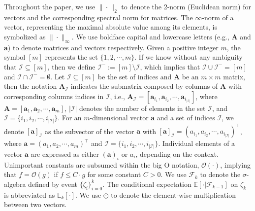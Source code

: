 \documentclass[aos]{imsart}
\numberwithin{equation}{section}
\theoremstyle{plain}
\begin{document}
Throughout the paper, we use $\|\cdot\|_2$ to denote the 2-norm (Euclidean norm) for vectors and the corresponding spectral norm for matrices. The $\infty$-norm of a vector, representing the maximal absolute value among its elements, is symbolized as $\|\cdot\|_{\infty}$. We use boldface capital and lowercase letters (e.g., $\bm{A}$ and $\bm{a}$) to denote matrices and vectors respectively. Given a positive integer $m$, the symbol $[m]$ represents the set $\{1, 2, \cdots, m\}$. If we know without any ambiguity that $\mathcal{I} \subseteq [m]$, then we define $\mathcal{I}^{-} := [m] \setminus \mathcal{I}$, which implies that $\mathcal{I} \cup \mathcal{I}^{-} = [m]$ and $\mathcal{I} \cap \mathcal{I}^{-} = \emptyset$. Let $\mathcal{I} \subseteq [m]$ be the set of indices and $\bm{A}$ be an $m \times m$ matrix, then the notation $\bm{A}_{\mathcal{I}}$ indicates the submatrix composed by columns of $\bm{A}$ with corresponding columns indices in $\mathcal{I}$, i.e., $\bm{A}_{\mathcal{I}} = [\bm{a}_{i_1}, \bm{a}_{i_2}, \cdots, \bm{a}_{i_{|\mathcal{I}|}}]$, where $\bm{A} = [\bm{a}_1, \bm{a}_2, \cdots, \bm{a}_{m}]$, $|\mathcal{I}|$ denotes the number of elements in the set $\mathcal{I}$, and $\mathcal{I} = \{i_1, i_2, \cdots, i_{|\mathcal{I}|}\}$. For an $m$-dimensional vector $\bm{a}$ and a set of indices $\mathcal{I}$, we denote $[\bm{a}]_{\mathcal{I}}$ as the subvector of the vector $\bm{a}$ with $[\bm{a}]_{\mathcal{I}} = (a_{i_1}, a_{i_2}, \cdots, a_{i_{|\mathcal{I}|}})^{\top}$, where $\bm{a} = (a_{1}, a_{2}, \cdots, a_{m})^{\top}$ and $\mathcal{I} = \{i_1, i_2, \cdots, i_{|\mathcal{I}|}\}$. Individual elements of a vector $\bm{a}$ are expressed as either $(\bm{a})_i$ or $a_i$, depending on the context. 
Unimportant constants are subsumed within the big O notation, $\mathcal{O}(\cdot)$, implying that $f = \mathcal{O}(g)$ if $f \leq C \cdot g$ for some constant $C > 0$. We use $\mathcal{F}_k$ to denote the $\sigma$-algebra defined by event $\{\zeta_{i}\}_{i=0}^{k}$. The conditional expectation $\mathbb{E}\left[\cdot | \mathcal{F}_{k-1}\right]$ on $\zeta_k$ is abbreviated as $\mathbb{E}_k\left[\cdot\right]$. We use $\odot$ to denote the element-wise multiplication between two vectors. 
\end{document}
